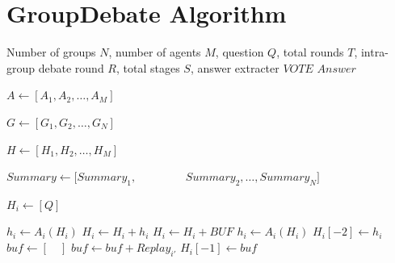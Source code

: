 \appendix
\section{GroupDebate Algorithm} \label{appendix:gd-al}
\begin{breakablealgorithm}
    \caption{GroupDebate Methods}
    \label{alg:GroupDebate}
    \begin{algorithmic}[1]
        \Require Number of groups $N$, number of agents  $M$, question $Q$, total rounds $T$, intra-group debate round $R$, total stages $S$, answer extracter $VOTE$ 
        \Ensure $Answer$
     
        \State $A \gets [A_1,A_2,\ldots,A_M]$ 
        \Statex {}

        \State $G \gets [G_1,G_2,\ldots,G_N]$  \Statex {} 

        \State $H \gets [H_1,H_2,\ldots,H_M]$  \Statex {}
        
        \State $Summary \gets [Summary_1,$
        \Statex $\qquad \qquad Summary_2,\ldots,Summary_N]$  
        \Statex {}

            \State $H_i \gets [Q]$ 
        \EndFor
        
                            \State $h_i \gets A_i(H_i)$ 
                            \State $H_i \gets H_i + h_i$ 
                            \State $H_i \gets H_i + BUF$ 
                            \State $h_i \gets A_i(H_i)$ 
                            \State $H_i[-2] \gets h_i$    
                        \Else
                            \State $buf \gets [\quad]$ 
                            \State $buf \gets buf + Replay_{i'}$  
                        \EndFor
                        \State $H_i[-1] \gets buf$ 
                    

\end{algorithmic}
\end{breakablealgorithm}
